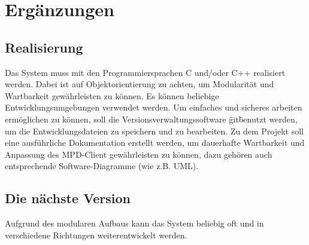 \section{Ergänzungen}
\subsection{Realisierung}
Das System muss mit den Programmiersprachen C und/oder C++ realisiert werden. Dabei ist auf
Objektorientierung zu achten, um Modularität und Wartbarkeit gewährleisten zu können.
Es können beliebige Entwicklungsumgebungen verwendet werden. Um einfaches und sicheres arbeiten
ermöglichen zu können, soll die Versionsverwaltungssoftware \"git\" benutzt werden, um die
Entwicklungsdateien zu speichern und zu bearbeiten. Zu dem Projekt soll eine ausführliche
Dokumentation erstellt werden, um dauerhafte Wartbarkeit und Anpassung des MPD-Client  gewährleisten
zu können, dazu gehören auch entsprechende Software-Diagramme (wie z.B. UML).
\subsection{Die nächste Version}
Aufgrund des modularen Aufbaus kann das System beliebig oft und in verschiedene Richtungen weiterentwickelt werden.
